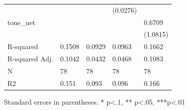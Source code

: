 \begin{table}
\begin{center}
\begin{tabular}{lllll}
                 &                            &                        & (0.0276)              &                            \\
tone\_net        &                            &                        &                       & 0.6709                     \\
                 &                            &                        &                       & (1.0815)                   \\
R-squared        & 0.1508                     & 0.0929                 & 0.0963                & 0.1662                     \\
R-squared Adj.   & 0.1042                     & 0.0432                 & 0.0468                & 0.1083                     \\
N                & 78                         & 78                     & 78                    & 78                         \\
R2               & 0.151                      & 0.093                  & 0.096                 & 0.166                      \\
\hline
\end{tabular}
\end{center}
\end{table}
\bigskip
Standard errors in parentheses. \newline 
* p<.1, ** p<.05, ***p<.01